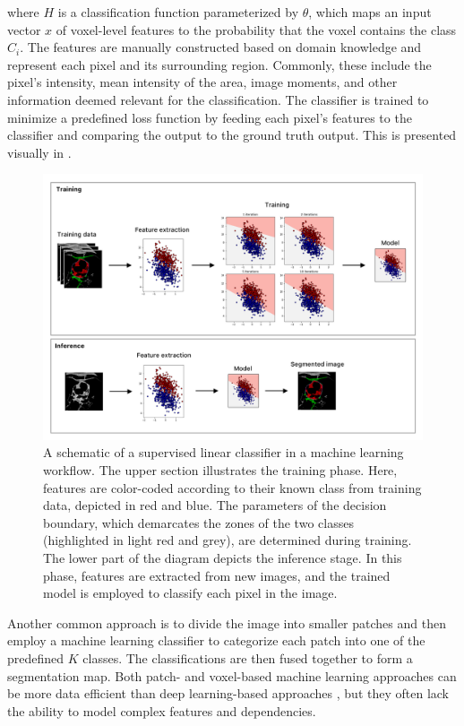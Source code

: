 where $H$ is a classification function parameterized by $\theta$, which maps an input vector $x$ of voxel-level features to the probability that the voxel contains the class $C_i$. The features are manually constructed based on domain knowledge and represent each pixel and its surrounding region. Commonly, these include the pixel's intensity, mean intensity of the area, image moments, and other information deemed relevant for the classification. The classifier is trained to minimize a predefined loss function by feeding each pixel's features to the classifier and comparing the output to the ground truth output. This is presented visually in .

\begin{figure}[h!]
 \centering
 \includegraphics[width=\linewidth]{images/machine_learning.png}
 \caption{A schematic of a supervised linear classifier in a machine learning workflow. The upper section illustrates the training phase. Here, features are color-coded according to their known class from training data, depicted in red and blue. The parameters of the decision boundary, which demarcates the zones of the two classes (highlighted in light red and grey), are determined during training. The lower part of the diagram depicts the inference stage. In this phase, features are extracted from new images, and the trained model is employed to classify each pixel in the image. \cite{bencevicRecentProgressEpicardial2022}}
 \label{fig:machine-learning}
 \end{figure}

Another common approach is to divide the image into smaller patches and then employ a machine learning classifier to categorize each patch into one of the predefined $K$ classes. The classifications are then fused together to form a segmentation map. Both patch- and voxel-based machine learning approaches can be more data efficient than deep learning-based approaches \cite{bencevicRecentProgressEpicardial2022}, but they often lack the ability to model complex features and dependencies. 

